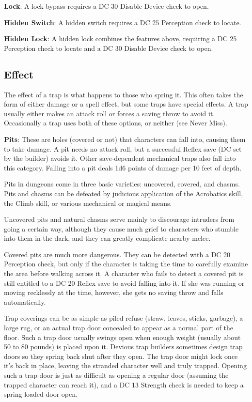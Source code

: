 \textbf{Lock}: A lock bypass requires a DC 30 Disable Device check to open. 
				
\textbf{Hidden Switch}: A hidden switch requires a DC 25 Perception check to locate.
				
\textbf{Hidden Lock}: A hidden lock combines the features above, requiring a DC 25 Perception check to locate and a DC 30 Disable Device check to open.
				
\subsection{Effect}

				
The effect of a trap is what happens to those who spring it. This often takes the form of either damage or a spell effect, but some traps have special effects. A trap usually either makes an attack roll or forces a saving throw to avoid it. Occasionally a trap uses both of these options, or neither (see Never Miss).
				
\textbf{Pits}: These are holes (covered or not) that characters can fall into, causing them to take damage. A pit needs no attack roll, but a successful Reflex save (DC set by the builder) avoids it. Other save-dependent mechanical traps also fall into this category. Falling into a pit deals 1d6 points of damage per 10 feet of depth.
				
Pits in dungeons come in three basic varieties: uncovered, covered, and chasms. Pits and chasms can be defeated by judicious application of the Acrobatics skill, the Climb skill, or various mechanical or magical means.
				
Uncovered pits and natural chasms serve mainly to discourage intruders from going a certain way, although they cause much grief to characters who stumble into them in the dark, and they can greatly complicate nearby melee.
				
Covered pits are much more dangerous. They can be detected with a DC 20 Perception check, but only if the character is taking the time to carefully examine the area before walking across it. A character who fails to detect a covered pit is still entitled to a DC 20 Reflex save to avoid falling into it. If she was running or moving recklessly at the time, however, she gets no saving throw and falls automatically.
				
Trap coverings can be as simple as piled refuse (straw, leaves, sticks, garbage), a large rug, or an actual trap door concealed to appear as a normal part of the floor. Such a trap door usually swings open when enough weight (usually about 50 to 80 pounds) is placed upon it. Devious trap builders sometimes design trap doors so they spring back shut after they open. The trap door might lock once it's back in place, leaving the stranded character well and truly trapped. Opening such a trap door is just as difficult as opening a regular door (assuming the trapped character can reach it), and a DC 13 Strength check is needed to keep a spring-loaded door open.
				
